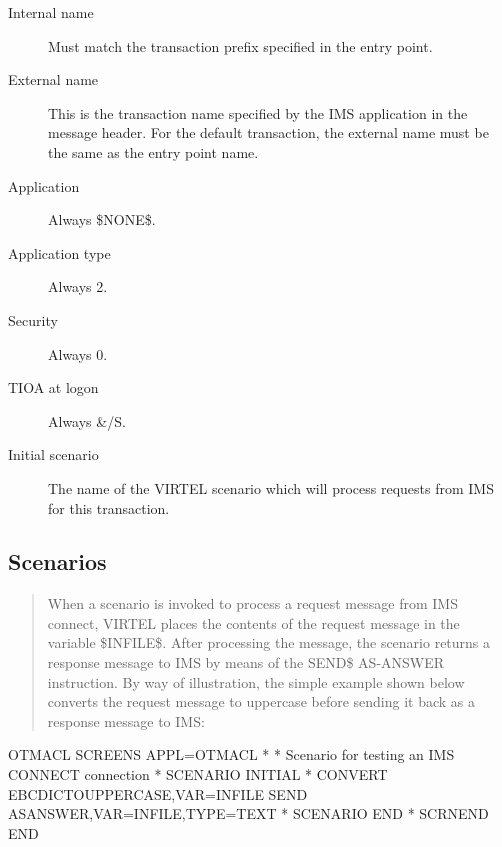 \documentclass[letterpaper,10pt,english]{sphinxmanual}
\begin{document}
\begin{description}
\item[{Internal name}] \leavevmode
Must match the transaction prefix specified in the entry point.

\item[{External name}] \leavevmode
This is the transaction name specified by the IMS application in the
message header. For the default transaction, the external name must
be the same as the entry point name.

\item[{Application}] \leavevmode
Always \$NONE\$.

\item[{Application type}] \leavevmode
Always 2.

\item[{Security}] \leavevmode
Always 0.

\item[{TIOA at logon}] \leavevmode
Always \&/S.

\item[{Initial scenario}] \leavevmode
The name of the VIRTEL scenario which will process requests from IMS
for this transaction.

\end{description}

\ignorespaces 

\subsection{Scenarios}
\label{\detokenize{connectivity_guide:scenarios}}\label{\detokenize{connectivity_guide:index-26}}\begin{quote}

When a scenario is invoked to process a request message from IMS connect, VIRTEL places the contents of the request message in the variable \$INFILE\$. After processing the message, the scenario  returns a response message to IMS by means of the SEND\$ AS-ANSWER instruction. By way of illustration, the simple example shown below converts the request message to uppercase before sending it back as a response message to IMS:
\end{quote}

\begin{sphinxVerbatim}[commandchars=\\\{\}]
OTMACL SCREENS APPL=OTMACL
*
* Scenario for testing an IMS CONNECT connection
*
SCENARIO INITIAL
*
CONVERT\PYGZdl{} EBCDIC\PYGZhy{}TO\PYGZhy{}UPPERCASE,VAR=\PYGZsq{}\PYGZdl{}INFILE\PYGZdl{}\PYGZsq{}
SEND\PYGZdl{} AS\PYGZhy{}ANSWER,VAR=\PYGZsq{}\PYGZdl{}INFILE\PYGZdl{}\PYGZsq{},TYPE=\PYGZsq{}TEXT\PYGZsq{}
*
SCENARIO END
*
SCRNEND
END
\end{sphinxVerbatim}
\end{document}

